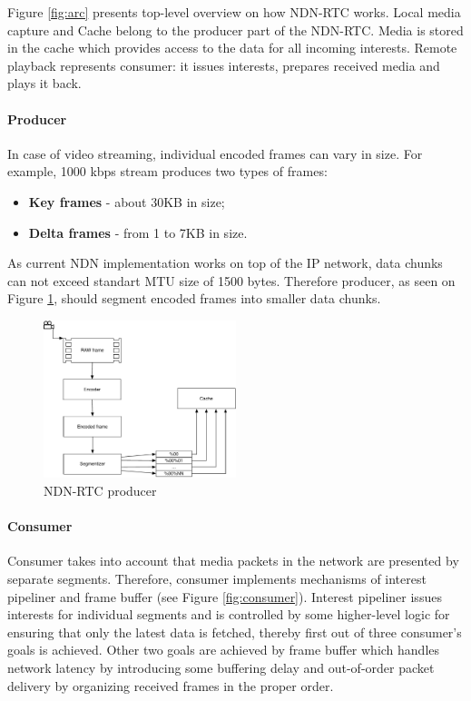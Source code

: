 \documentclass[10pt]{proc}
\begin{document}
Figure \ref{fig:arc} presents top-level overview on how NDN-RTC works. Local media capture and Cache belong to the producer part of the NDN-RTC. Media is stored in the cache which provides access to the data for all incoming interests. Remote playback represents consumer: it issues interests, prepares received media and plays it back.

\paragraph{Producer}

In case of video streaming, individual encoded frames can vary in size. For example, 1000 kbps stream produces two types of frames:
\begin{itemize}
\item \textbf{Key frames} - about 30KB in size;
\item \textbf{Delta frames} - from 1 to 7KB in size. 
\end{itemize}

As current NDN implementation works on top of the IP network, data chunks can not exceed standart MTU size of 1500 bytes. Therefore producer, as seen on Figure \ref{fig:producer}, should segment encoded frames into smaller data chunks.

\begin{figure}[Ht!]
\centering
\includegraphics[width=0.5\textwidth]{producer}
\caption{NDN-RTC producer}
\label{fig:producer}
\end{figure}

\paragraph{Consumer}

Consumer takes into account that media packets in the network are presented by separate segments. Therefore, consumer implements mechanisms of interest pipeliner and frame buffer (see Figure \ref{fig:consumer}). Interest pipeliner issues interests for individual segments and is controlled by some higher-level logic for ensuring that only the latest data is fetched, thereby first out of three consumer's goals is achieved. Other two goals are achieved by frame buffer which handles network latency by introducing some buffering delay and out-of-order packet delivery by organizing received frames in the proper order. 
\end{document}
